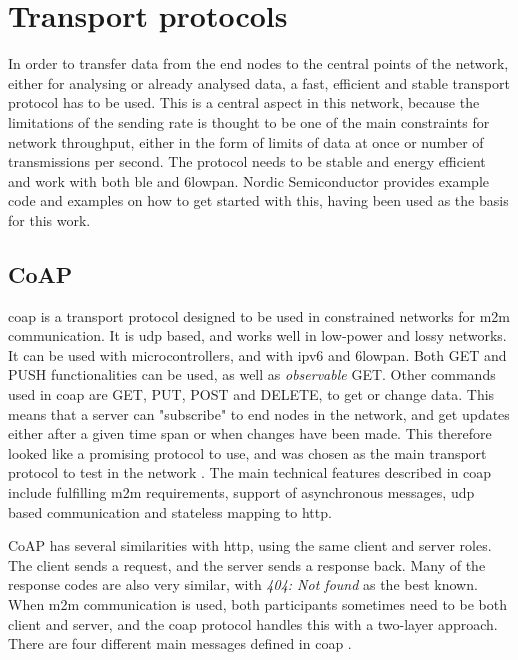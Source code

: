 \section{Transport protocols}

\noindent In order to transfer data from the end nodes to the central points of the network, either for analysing or already analysed data, a fast, efficient and stable transport protocol has to be used. This is a central aspect in this network, because the limitations of the sending rate is thought to be one of the main constraints for network throughput, either in the form of limits of data at once or number of transmissions per second. The protocol needs to be stable and energy efficient and work with both \gls{ble} and \gls{6lowpan}. Nordic Semiconductor provides example code and examples on how to get started with this, having been used as the basis for this work.

\subsection{CoAP}


\noindent \gls{coap} is a transport protocol designed to be used in constrained networks for \gls{m2m} communication. It is \gls{udp} based, and works well in low-power and lossy networks. It can be used with \glspl{microcontroller}, and with \gls{ipv6} and \gls{6lowpan}. Both GET and PUSH functionalities can be used, as well as \textit{observable} GET. Other commands used in \gls{coap} are GET, PUT, POST and DELETE, to get or change data. This means that a server can "subscribe" to end nodes in the network, and get updates either after a given time span or when changes have been made. This therefore looked like a promising protocol to use, and was chosen as the main transport protocol to test in the network \cite{shelby2014constrained}. The main technical features described in \gls{coap} include fulfilling \gls{m2m} requirements, support of asynchronous messages, \gls{udp} based communication and stateless mapping to \gls{http}. 

\noindent CoAP has several similarities with \gls{http}, using the same client and server roles. The client sends a request, and the server sends a response back. Many of the response codes are also very similar, with \textit{404: Not found} as the best known. When \gls{m2m} communication is used, both participants sometimes need to be both client and server, and the \gls {coap} protocol handles this with a two-layer approach. There are four different main messages defined in \gls{coap} \cite{shelby2014constrained}. 

